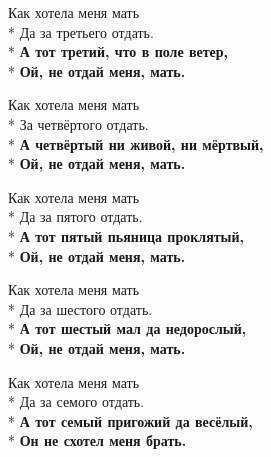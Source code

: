\medskip

\begin{minipage}{\linewidth}
Как хотела меня мать\\*
Да за третьего отдать.\\*
\textbf{А тот третий, что в поле ветер,}\\*
\textbf{Ой, не отдай меня, мать.}\\
\end{minipage}\par\medskip\nobreak

\medskip

\begin{minipage}{\linewidth}
Как хотела меня мать\\*
За четвёртого отдать.\\*
\textbf{А четвёртый ни живой, ни мёртвый,}\\*
\textbf{Ой, не отдай меня, мать.}\\
\end{minipage}\par\medskip\nobreak

\medskip

\begin{minipage}{\linewidth}
Как хотела меня мать\\*
Да за пятого отдать.\\*
\textbf{А тот пятый пьяница проклятый,}\\*
\textbf{Ой, не отдай меня, мать.}\\
\end{minipage}\par\medskip\nobreak

\medskip

\begin{minipage}{\linewidth}
Как хотела меня мать\\*
Да за шестого отдать.\\*
\textbf{А тот шестый  мал да недорослый,}\\*
\textbf{Ой, не отдай меня, мать.}\\
\end{minipage}\par\medskip\nobreak

\medskip

\begin{minipage}{\linewidth}
Как хотела меня мать\\*
Да за семого отдать.\\*
\textbf{А тот семый пригожий да весёлый,}\\*
\textbf{Он не схотел меня брать.}\\
\end{minipage}

